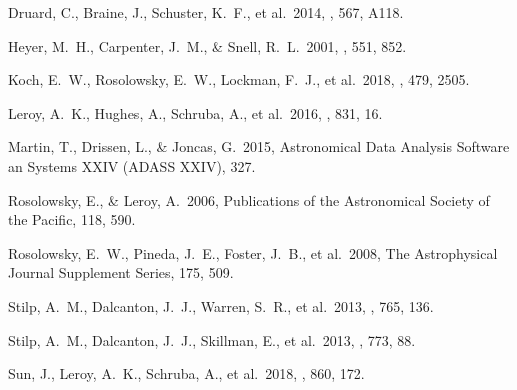 \documentclass{rnaastex}
\begin{document}
\begin{thebibliography}{}

 Druard, C., Braine, J., Schuster, K.~F., et al.\ 2014, \aap, 567, A118.

 Heyer, M.~H., Carpenter, J.~M., \& Snell, R.~L.\ 2001, \apj, 551, 852.

 Koch, E.~W., Rosolowsky, E.~W., Lockman, F.~J., et al.\ 2018, \mnras, 479, 2505.

 Leroy, A.~K., Hughes, A., Schruba, A., et al.\ 2016, \apj, 831, 16.

 Martin, T., Drissen, L., \& Joncas, G.\ 2015, Astronomical Data Analysis Software an Systems XXIV (ADASS XXIV), 327.

 Rosolowsky, E., \& Leroy, A.\ 2006, Publications of the Astronomical Society of the Pacific, 118, 590.

 Rosolowsky, E.~W., Pineda, J.~E., Foster, J.~B., et al.\ 2008, The Astrophysical Journal Supplement Series, 175, 509.

 Stilp, A.~M., Dalcanton, J.~J., Warren, S.~R., et al.\ 2013, \apj, 765, 136.

 Stilp, A.~M., Dalcanton, J.~J., Skillman, E., et al.\ 2013, \apj, 773, 88.

 Sun, J., Leroy, A.~K., Schruba, A., et al.\ 2018, \apj, 860, 172.


\end{thebibliography}
\end{document}
